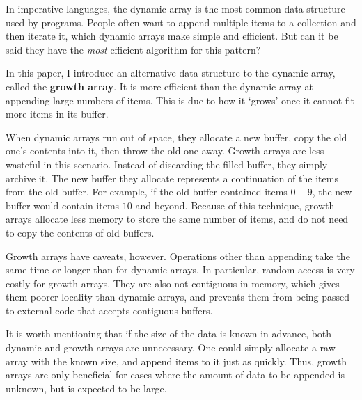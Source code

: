 In imperative languages, the dynamic array is the most common data structure used by programs. People often want to append multiple items to a collection and then iterate it, which dynamic arrays make simple and efficient. But can it be said they have the \textit{most} efficient algorithm for this pattern?

In this paper, I introduce an alternative data structure to the dynamic array, called the \textbf{growth array}. It is more efficient than the dynamic array at appending large numbers of items. This is due to how it `grows' once it cannot fit more items in its buffer.

When dynamic arrays run out of space, they allocate a new buffer, copy the old one's contents into it, then throw the old one away. Growth arrays are less wasteful in this scenario. Instead of discarding the filled buffer, they simply archive it. The new buffer they allocate represents a continuation of the items from the old buffer. For example, if the old buffer contained items $0 - 9$, the new buffer would contain items $10$ and beyond. Because of this technique, growth arrays allocate less memory to store the same number of items, and do not need to copy the contents of old buffers.

Growth arrays have caveats, however. Operations other than appending take the same time or longer than for dynamic arrays. In particular, random access is very costly for growth arrays. They are also not contiguous in memory, which gives them poorer locality than dynamic arrays, and prevents them from being passed to external code that accepts contiguous buffers.

It is worth mentioning that if the size of the data is known in advance, both dynamic and growth arrays are unnecessary. One could simply allocate a raw array with the known size, and append items to it just as quickly. Thus, growth arrays are only beneficial for cases where the amount of data to be appended is unknown, but is expected to be large.